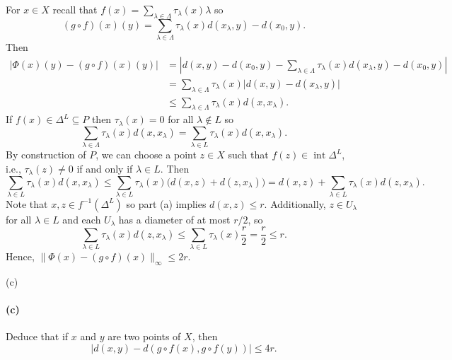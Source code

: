 \documentclass[12pt]{article}
\newlength{\myparskip}
\newenvironment{fullbox}{\begin{lrbox}{\savefullbox}\begin{minipage}{\dimexpr\textwidth-2\fboxsep\relax}\setlength{\parskip}{\myparskip}}{\end{minipage}\end{lrbox}\framebox[\textwidth]{\usebox{\savefullbox}}}
\newenvironment{pbox}[1][]{\begin{fullbox}\ifx#1\empty\else\paragraph{#1}\phantom{}\fi}{\end{fullbox}}
\theoremstyle{definition}
\newcommand{\<}{\langle}
\renewcommand{\>}{\rangle}
\DeclareMathOperator{\inter}{int}
\begin{document}
For $x \in X$ recall that $f(x) = \sum_{\lambda \in \Lambda} \tau_\lambda(x) \lambda$ so
\[
    (g \circ f)(x)(y) = \sum_{\lambda \in \Lambda} \tau_\lambda(x) d(x_\lambda, y) - d(x_0, y).
\]
Then
\begin{align*}
    |\Phi(x)(y) - (g \circ f)(x)(y)|
        &= \left|d(x, y) - d(x_0, y) - \sum_{\lambda \in \Lambda} \tau_\lambda(x) d(x_\lambda, y) - d(x_0, y)\right| \\
        &= \sum_{\lambda \in \Lambda} \tau_\lambda(x) \big|d(x, y) - d(x_\lambda, y)\big| \\
        &\leq \sum_{\lambda \in \Lambda} \tau_\lambda(x) d(x, x_\lambda).
\end{align*}
If $f(x) \in \Delta^L \subseteq P$ then $\tau_\lambda(x) = 0$ for all $\lambda \notin L$ so
\[
    \sum_{\lambda \in \Lambda} \tau_\lambda(x) d(x, x_\lambda)
        = \sum_{\lambda \in L} \tau_\lambda(x) d(x, x_\lambda).
\]
By construction of $P$, we can choose a point $z \in X$ such that $f(z) \in \inter \Delta^L$, i.e., $\tau_\lambda(z) \ne 0$ if and only if $\lambda \in L$.
Then
\[
    \sum_{\lambda \in L} \tau_\lambda(x) d(x, x_\lambda)
        \leq \sum_{\lambda \in L} \tau_\lambda(x) \big(d(x, z) + d(z, x_\lambda)\big)
        = d(x, z) + \sum_{\lambda \in L} \tau_\lambda(x) d(z, x_\lambda).
\]
Note that $x, z \in f^{-1}(\Delta^L)$ so part (a) implies $d(x, z) \leq r$. Additionally, $z \in U_\lambda$ for all $\lambda \in L$ and each $U_\lambda$ has a diameter of at most $r/2$, so
\[
    \sum_{\lambda \in L} \tau_\lambda(x) d(z, x_\lambda)
        \leq \sum_{\lambda \in L} \tau_\lambda(x) \frac{r}{2}
        = \frac{r}{2}
        \leq r.
\]
Hence, $\|\Phi(x) - (g \circ f)(x)\|_\infty \leq 2r$.


\newpage
\begin{pbox}[(c)]
    Deduce that if $x$ and $y$ are two points of $X$, then
    \[|d(x,y)-d(g\circ f(x),g \circ f(y))| \leq 4r.\]
\end{pbox}
\end{document}
